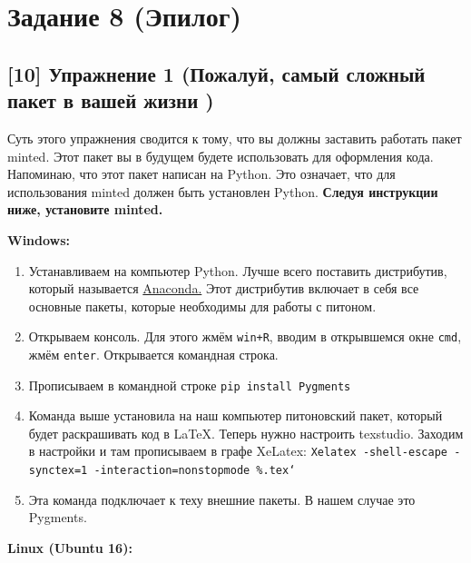 \documentclass[12pt, a4paper, oneside]{article}
\begin{document}
\section*{Задание 8 (Эпилог)  }

\subsection*{[10]   Упражнение 1 (Пожалуй, самый сложный пакет в вашей жизни ) }

	Суть этого упражнения сводится к тому, что вы должны заставить работать пакет minted.  Этот пакет вы в будущем будете использовать для оформления кода.  Напоминаю, что этот пакет написан на Python. Это означает, что для использования minted должен быть установлен Python. \textbf{Следуя инструкции ниже, установите minted.} 

\textbf{Windows:}

\begin{enumerate}
	\item Устанавливаем на компьютер Python. Лучше всего поставить дистрибутив, который называется \href{https://docs.continuum.io/anaconda/install}{Anaconda.} Этот дистрибутив включает в себя все основные пакеты, которые необходимы для работы с питоном. 
	
	\item Открываем консоль. Для этого жмём \texttt{win+R}, вводим в открывшемся окне \texttt{cmd}, жмём \texttt{enter}.  Открывается командная строка. 
	
	\item Прописываем в командной строке \texttt{pip install Pygments}
	
	\item Команда выше установила на наш компьютер питоновский пакет, который будет раскрашивать код в \LaTeX{}. Теперь нужно настроить texstudio. Заходим в настройки и там прописываем в графе  XeLatex: \newline  \texttt{Xelatex -shell-escape -synctex=1 -interaction=nonstopmode \%.tex`}
	
	\item Эта команда подключает к теху внешние пакеты. В нашем случае это Pygments. 
\end{enumerate} 


\textbf{Linux (Ubuntu 16):}
\end{document}
